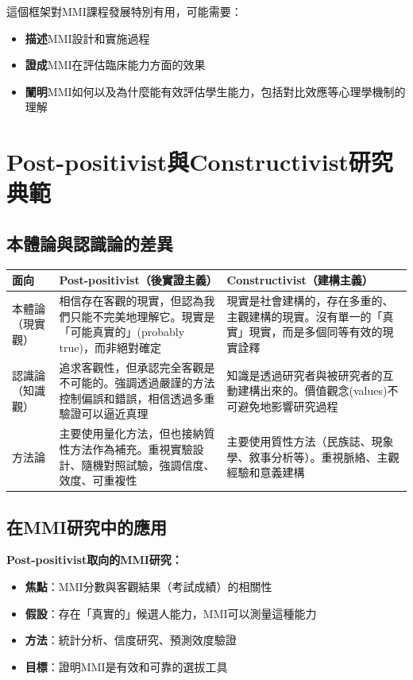 \documentclass[12pt,a4paper]{article}
\begin{document}
這個框架對MMI課程發展特別有用，可能需要：
\begin{itemize}[nosep]
    \item \textbf{描述}MMI設計和實施過程
    \item \textbf{證成}MMI在評估臨床能力方面的效果
    \item \textbf{闡明}MMI如何以及為什麼能有效評估學生能力，包括對比效應等心理學機制的理解
\end{itemize}

\section{Post-positivist與Constructivist研究典範}

\subsection{本體論與認識論的差異}

\begin{longtable}{p{3.5cm}p{5.5cm}p{5.5cm}}
\toprule
\textbf{面向} & \textbf{Post-positivist（後實證主義）} & \textbf{Constructivist（建構主義）} \\
\midrule
\endhead
本體論（現實觀） & 相信存在客觀的現實，但認為我們只能不完美地理解它。現實是「可能真實的」(probably true)，而非絕對確定 & 現實是社會建構的，存在多重的、主觀建構的現實。沒有單一的「真實」現實，而是多個同等有效的現實詮釋 \\
認識論（知識觀） & 追求客觀性，但承認完全客觀是不可能的。強調透過嚴謹的方法控制偏誤和錯誤，相信透過多重驗證可以逼近真理 & 知識是透過研究者與被研究者的互動建構出來的。價值觀念(values)不可避免地影響研究過程 \\
方法論 & 主要使用量化方法，但也接納質性方法作為補充。重視實驗設計、隨機對照試驗，強調信度、效度、可重複性 & 主要使用質性方法（民族誌、現象學、敘事分析等）。重視脈絡、主觀經驗和意義建構 \\
\bottomrule
\end{longtable}

\subsection{在MMI研究中的應用}

\textbf{Post-positivist取向的MMI研究：}
\begin{itemize}[nosep]
    \item \textbf{焦點}：MMI分數與客觀結果（考試成績）的相關性
    \item \textbf{假設}：存在「真實的」候選人能力，MMI可以測量這種能力
    \item \textbf{方法}：統計分析、信度研究、預測效度驗證
    \item \textbf{目標}：證明MMI是有效和可靠的選拔工具
\end{itemize}
\end{document}
